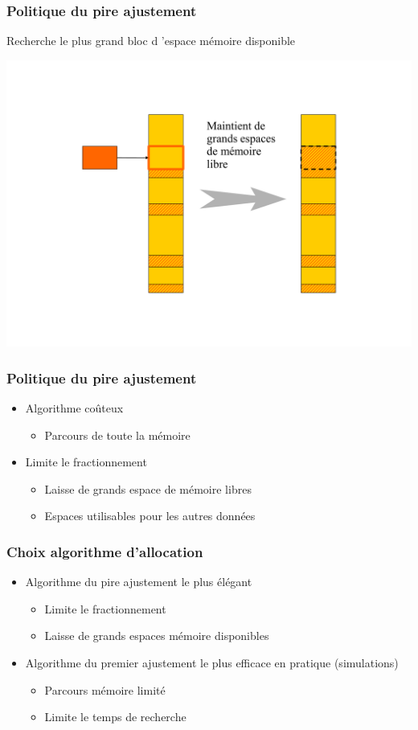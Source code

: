 \begin{frame}
\frametitle{Politique du pire ajustement}
Recherche le plus grand bloc d ’espace mémoire disponible

\includegraphics[width=.7\textwidth]{../illustration/memoire_principale_pire_ajustement.pdf}
\end{frame}


\begin{frame}
\frametitle{Politique du pire ajustement}
\begin{itemize}
\item Algorithme coûteux
\begin{itemize}
\item Parcours de toute la mémoire
\end{itemize}
\item Limite le fractionnement
\begin{itemize}
\item Laisse de grands espace de mémoire libres
\item Espaces utilisables pour les autres données
\end{itemize}
\end{itemize}
\end{frame}



\begin{frame}
\frametitle{Choix algorithme d’allocation}
\begin{itemize}
\item Algorithme du pire ajustement le plus élégant
\begin{itemize}
\item Limite le fractionnement
\item Laisse de grands espaces mémoire disponibles
\end{itemize}
\item Algorithme du premier ajustement le plus efficace en pratique (simulations)
\begin{itemize}
\item Parcours mémoire limité
\item Limite le temps de recherche
\end{itemize}
\end{itemize}
\end{frame}


